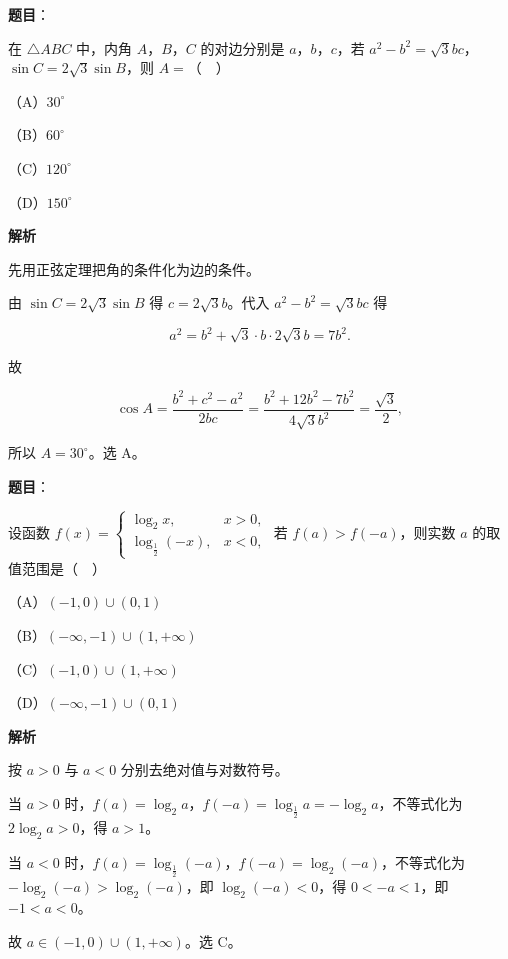 \begin{answer}

\textbf{题目}：

在 $\triangle ABC$ 中，内角 $A$，$B$，$C$ 的对边分别是 $a$，$b$，$c$，若 $a^2-b^2=\sqrt3bc$，$\sin C=2\sqrt3\sin B$，则 $A=$（　）

（A）$30^\circ$

（B）$60^\circ$

（C）$120^\circ$

（D）$150^\circ$

\textbf{解析}

先用正弦定理把角的条件化为边的条件。

由 $\sin C=2\sqrt3\sin B$ 得 $c=2\sqrt3b$。代入 $a^2-b^2=\sqrt3bc$ 得

\nopagebreak[4]
\[a^2=b^2+\sqrt3\cdot b\cdot2\sqrt3b=7b^2.\]

故

\nopagebreak[4]
\[\cos A=\frac{b^2+c^2-a^2}{2bc}
=\frac{b^2+12b^2-7b^2}{4\sqrt3b^2}=\frac{\sqrt3}2,\]

所以 $A=30^\circ$。选 A。


\end{answer}
\begin{answer}

\textbf{题目}：

设函数 $f(x)=\begin{cases}\log_2x,&x>0,\\ \log_{\frac12}(-x),&x<0,\end{cases}$ 若 $f(a)>f(-a)$，则实数 $a$ 的取值范围是（　）

（A）$(-1,0)\cup(0,1)$

（B）$(-\infty,-1)\cup(1,+\infty)$

（C）$(-1,0)\cup(1,+\infty)$

（D）$(-\infty,-1)\cup(0,1)$

\textbf{解析}

按 $a>0$ 与 $a<0$ 分别去绝对值与对数符号。

当 $a>0$ 时，$f(a)=\log_2a$，$f(-a)=\log_{\frac12}a=-\log_2a$，不等式化为 $2\log_2a>0$，得 $a>1$。

当 $a<0$ 时，$f(a)=\log_{\frac12}(-a)$，$f(-a)=\log_2(-a)$，不等式化为 $-\log_2(-a)>\log_2(-a)$，即 $\log_2(-a)<0$，得 $0<-a<1$，即 $-1<a<0$。

故 $a\in(-1,0)\cup(1,+\infty)$。选 C。


\end{answer}
